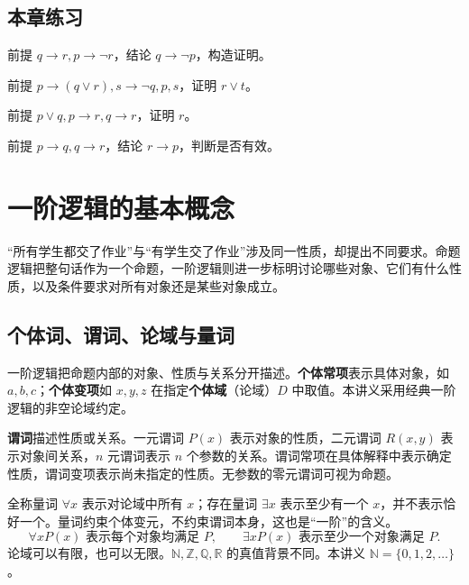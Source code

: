 \documentclass[UTF8,fontset=none,zihao=-4,a4paper]{ctexart}
\newcommand{\chapterpage}[1]{\clearpage\section{#1}}
\newcommand{\exercise}{\subsection{本章练习}}
\newcommand{\term}[1]{\textbf{#1}}
\begin{document}
\exercise
\begin{enumerate}[label=3.\arabic*.,leftmargin=2.8em]
\begin{samepage}
\item  前提 $q\to r,p\to\neg r$，结论 $q\to\neg p$，构造证明。
\end{samepage}

\begin{samepage}
\item  前提 $p\to(q\lor r),s\to\neg q,p,s$，证明 $r\lor t$。
\end{samepage}

\begin{samepage}
\item  前提 $p\lor q,p\to r,q\to r$，证明 $r$。
\end{samepage}

\begin{samepage}
\item  前提 $p\to q,q\to r$，结论 $r\to p$，判断是否有效。
\end{samepage}
\end{enumerate}


\chapterpage{一阶逻辑的基本概念}

“所有学生都交了作业”与“有学生交了作业”涉及同一性质，却提出不同要求。命题逻辑把整句话作为一个命题，一阶逻辑则进一步标明讨论哪些对象、它们有什么性质，以及条件要求对所有对象还是某些对象成立。
\subsection{个体词、谓词、论域与量词}
一阶逻辑把命题内部的对象、性质与关系分开描述。\term{个体常项}表示具体对象，如 $a,b,c$；\term{个体变项}如 $x,y,z$ 在指定\term{个体域}（论域）$D$ 中取值。本讲义采用经典一阶逻辑的非空论域约定。

\term{谓词}描述性质或关系。一元谓词 $P(x)$ 表示对象的性质，二元谓词 $R(x,y)$ 表示对象间关系，$n$ 元谓词表示 $n$ 个参数的关系。谓词常项在具体解释中表示确定性质，谓词变项表示尚未指定的性质。无参数的零元谓词可视为命题。

全称量词 $\forall x$ 表示对论域中所有 $x$；存在量词 $\exists x$ 表示至少有一个 $x$，并不表示恰好一个。量词约束个体变元，不约束谓词本身，这也是“一阶”的含义。
\[
\forall xP(x)\text{ 表示每个对象均满足 }P,\qquad
\exists xP(x)\text{ 表示至少一个对象满足 }P.
\]
论域可以有限，也可以无限。$\mathbb N,\mathbb Z,\mathbb Q,\mathbb R$ 的真值背景不同。本讲义 $\mathbb N=\{0,1,2,\ldots\}$。
\end{document}
